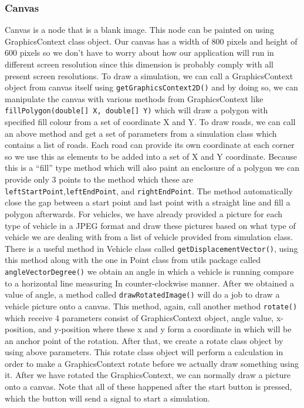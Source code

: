\documentclass[11pt]{article}
\begin{document}
\subsubsection{Canvas}
Canvas is a node that is a blank image. This node can be painted on using GraphicsContext class object. Our canvas has a width of 800 pixels and height of 600 pixels so we don’t have to worry about how our application will run in different screen resolution since this dimension is probably comply with all present screen resolutions. To draw a simulation, we can call a GraphicsContext object from canvas itself using \texttt{getGraphicsContext2D()} and by doing so, we can manipulate the canvas with various methods from GraphicsContext like \texttt{fillPolygon(double[] X, double[] Y)} which will draw a polygon with specified fill colour from a set of coordinate X and Y. To draw roads, we can call an above method and get a set of parameters from a simulation class which contains a list of roads. Each road can provide its own coordinate at each corner so we use this as elements to be added into a set of X and Y coordinate. Because this is a “fill” type method which will also paint an enclosure of a polygon we can provide only 3 points to the method which these are \texttt{leftStartPoint},\texttt{leftEndPoint}, and \texttt{rightEndPoint}. The method automatically close the gap between a start point and last point with a straight line and fill a polygon afterwards. For vehicles, we have already provided a picture for each type of vehicle in a JPEG format and draw these pictures based on what type of vehicle we are dealing with from a list of vehicle provided from simulation class. There is a useful method in Vehicle class called \texttt{getDisplacementVector()}, using this method along with the one in Point class from utils package called \texttt{angleVectorDegree()} we obtain an angle in which a vehicle is running compare to a horizontal line measuring In counter-clockwise manner. After we obtained a value of angle, a method called \texttt{drawRotatedImage()} will do a job to draw a vehicle picture onto a canvas. This method, again, call another method \texttt{rotate()} which receive 4 parameters consist of GraphicsContext object, angle value, x-position, and y-position where these x and y form a coordinate in which will be an anchor point of the rotation. After that, we create a rotate class object by using above parameters. This rotate class object will perform a calculation in order to make a GraphicsContext rotate before we actually draw something using it. After we have rotated the GraphicsContext, we can normally draw a picture onto a canvas. Note that all of these happened after the start button is pressed, which the button will send a signal to start a simulation.
\end{document}
